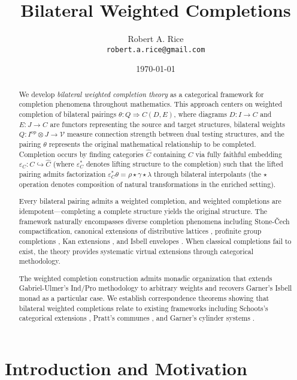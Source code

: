 \documentclass[11pt]{article}
\title{Bilateral Weighted Completions}
\author{Robert A. Rice\\
\texttt{robert.a.rice@gmail.com}}
\date{\today}
\theoremstyle{plain}
\theoremstyle{definition}
\theoremstyle{remark}
\newcommand{\V}{\mathcal{V}}
\newcommand{\op}{\mathrm{op}}
\begin{document}
\maketitle

\begin{abstract}
We develop \emph{bilateral weighted completion theory} as a categorical framework for completion phenomena throughout mathematics. This approach centers on weighted completion of bilateral pairings $\theta : Q \Rightarrow C(D,E)$, where diagrams $D : I \to C$ and $E : J \to C$ are functors representing the source and target structures, bilateral weights $Q : I^{\op} \otimes J \to \V$ measure connection strength between dual testing structures, and the pairing $\theta$ represents the original mathematical relationship to be completed. Completion occurs by finding categories $\widehat{C}$ containing $C$ via fully faithful embedding $\varepsilon_C : C \hookrightarrow \widehat{C}$ (where $\varepsilon_C^*$ denotes lifting structure to the completion) such that the lifted pairing admits factorization $\varepsilon_C^* \theta = \rho \star \gamma \star \lambda$ through bilateral interpolants (the $\star$ operation denotes composition of natural transformations in the enriched setting).

Every bilateral pairing admits a weighted completion, and weighted completions are idempotent---completing a complete structure yields the original structure. The framework naturally encompasses diverse completion phenomena including Stone-\v{C}ech compactification, canonical extensions of distributive lattices \cite{jonsson1951boolean}, profinite group completions \cite{pontryagin1966topological}, Kan extensions \cite{kan1958adjoint}, and Isbell envelopes \cite{isbell1960adequate}. When classical completions fail to exist, the theory provides systematic virtual extensions through categorical methodology.

The weighted completion construction admits monadic organization that extends Gabriel-Ulmer's Ind/Pro methodology \cite{gabriel1971lokal} to arbitrary weights and recovers Garner's Isbell monad \cite{garner2018isbell} as a particular case. We establish correspondence theorems showing that bilateral weighted completions relate to existing frameworks including Schoots's categorical extensions \cite{schoots2015generalising}, Pratt's communes \cite{pratt2010communes}, and Garner's cylinder systems \cite{garner2018isbell}.
\end{abstract}

\section{Introduction and Motivation}
\end{document}
